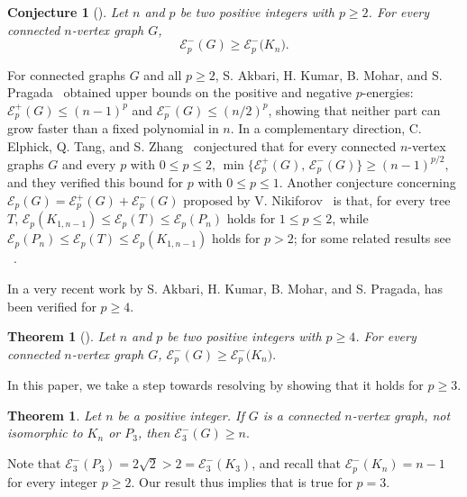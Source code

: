 \documentclass[a4paper,12pt]{article}
\theoremstyle{plain}
\newtheorem{theorem}[thm]{Theorem}
\newtheorem{conjecture}[thm]{Conjecture}
\begin{document}
\begin{conjecture}[\cite{AKBARI202596}]\label{conj:negative}
Let $n$ and $p$ be two positive integers with $p\geq 2$. For every connected $n$-vertex graph $G$, $$\mathcal{E}^-_p({G}) \geq \mathcal{E}^-_p({K_{n})}.$$
\end{conjecture}


For connected graphs $G$ and all $p\ge 2$, S. Akbari, H. Kumar, B. Mohar, and S. Pragada~\cite{AKBARI202596} obtained upper bounds on the positive and negative $p$-energies: $\mathcal{E}_p^{+}(G)\le (n-1)^{p}$ and $\mathcal{E}_p^{-}(G)\le (n/2)^{p}$, showing that neither part can grow faster than a fixed polynomial in $n$. In a complementary direction, C. Elphick, Q. Tang, and S. Zhang~\cite{ELPHICK2026104252} conjectured that for every connected $n$-vertex graphs $G$ and every $p$ with $0\le p\le 2$, 
$\min\{\mathcal{E}_p^{+}(G),\, \mathcal{E}_p^{-}(G)\}\ge (n-1)^{p/2},$
and they verified this bound for $p$ with $0\leq p\leq1$. Another conjecture concerning $\mathcal{E}_p(G)=\mathcal{E}_p^{+}(G)+ \mathcal{E}_p^{-}(G)$ proposed by V. Nikiforov~\cite{NIKIFOROV201682} is that, for every tree $T$, $\mathcal{E}_p(K_{1,{n-1}})\le \mathcal{E}_p(T)\le \mathcal{E}_p(P_n)$ holds for $1\le p\le 2$, while $\mathcal{E}_p(P_n)\le \mathcal{E}_p(T)\le \mathcal{E}_p(K_{1,n-1})$ holds for $p>2$; for some related results see ~\cite{Arizmendi2023TheGE,Arizmendi2023}.

In a very recent work \cite{AKBARI202596} by S. Akbari, H. Kumar, B. Mohar, and S. Pragada,  has been verified for $p \geq 4$. 

\begin{theorem}[\cite{AKBARI202596}]
Let $n$ and $p$ be two positive integers with $p\geq 4$. For every connected $n$-vertex graph $G$, $\mathcal{E}^-_p({G}) \geq \mathcal{E}^-_p({K_{n})}.$
\end{theorem}

In this paper, we take a step towards resolving  by showing that it holds for $p\geq 3$. 

\begin{theorem}\label{thm:3-energy-main}
Let $n$ be a positive integer. If $G$ is a connected $n$-vertex graph, not isomorphic to $K_n$ or $P_3$, then $\mathcal{E}_3^{-}(G) \geq n.$
\end{theorem}

Note that $\mathcal{E}_3^{-}(P_3)=2\sqrt{2}>2=\mathcal{E}_3^{-}(K_3)$, and recall that $\mathcal{E}_p^-(K_n)=n-1$ for every integer $p\geq 2$. Our result thus implies that  is true for $p=3$. 
\end{document}
